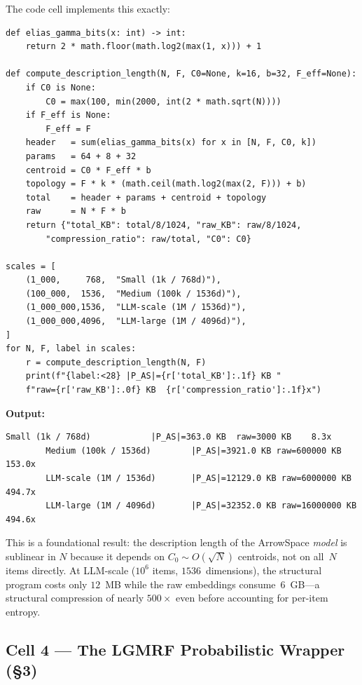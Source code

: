 \documentclass[12pt,a4paper]{article}
\theoremstyle{plain}
\theoremstyle{definition}
\theoremstyle{remark}
\newcommand{\1}{\mathbf{1}}
\begin{document}
	The code cell implements this exactly:
	
	\begin{lstlisting}[caption={Description length of the ArrowSpace program},
		label={lst:desclength}]
def elias_gamma_bits(x: int) -> int:
	return 2 * math.floor(math.log2(max(1, x))) + 1
		
def compute_description_length(N, F, C0=None, k=16, b=32, F_eff=None):
	if C0 is None:
		C0 = max(100, min(2000, int(2 * math.sqrt(N))))
	if F_eff is None:
		F_eff = F
	header   = sum(elias_gamma_bits(x) for x in [N, F, C0, k])
	params   = 64 + 8 + 32
	centroid = C0 * F_eff * b
	topology = F * k * (math.ceil(math.log2(max(2, F))) + b)
	total    = header + params + centroid + topology
	raw      = N * F * b
	return {"total_KB": total/8/1024, "raw_KB": raw/8/1024,
		"compression_ratio": raw/total, "C0": C0}
		
scales = [
	(1_000,     768,  "Small (1k / 768d)"),
	(100_000,  1536,  "Medium (100k / 1536d)"),
	(1_000_000,1536,  "LLM-scale (1M / 1536d)"),
	(1_000_000,4096,  "LLM-large (1M / 4096d)"),
]
for N, F, label in scales:
	r = compute_description_length(N, F)
	print(f"{label:<28} |P_AS|={r['total_KB']:.1f} KB "
	f"raw={r['raw_KB']:.0f} KB  {r['compression_ratio']:.1f}x")
	\end{lstlisting}
	
	\noindent\textbf{Output:}
	\begin{lstlisting}[numbers=none, backgroundcolor=\color{white},
		frame=none]
		Small (1k / 768d)            |P_AS|=363.0 KB  raw=3000 KB    8.3x
		Medium (100k / 1536d)        |P_AS|=3921.0 KB raw=600000 KB  153.0x
		LLM-scale (1M / 1536d)       |P_AS|=12129.0 KB raw=6000000 KB 494.7x
		LLM-large (1M / 4096d)       |P_AS|=32352.0 KB raw=16000000 KB 494.6x
	\end{lstlisting}
	
	This is a foundational result: the description length of the ArrowSpace
	\emph{model} is sublinear in $N$ because it depends on $C_0 \sim
	O(\sqrt{N})$ centroids, not on all~$N$ items directly.
	At LLM-scale ($10^6$ items, $1536$~dimensions), the structural program
	costs only $12$~MB while the raw embeddings consume~$6$~GB---a
	structural compression of nearly $500\times$ even before accounting for
	per-item entropy.
	
	\subsection{Cell 4 --- The LGMRF Probabilistic Wrapper (§3)}
	
\end{document}
